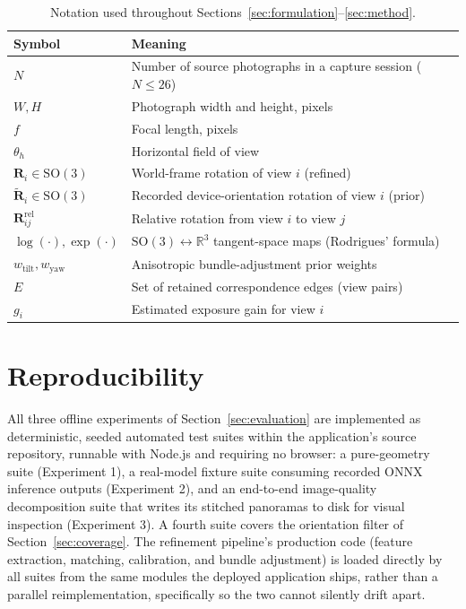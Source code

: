 \documentclass[11pt]{article}
\newcommand{\SO}{\mathrm{SO}(3)}
\newcommand{\R}{\mathbb{R}}
\newcommand{\mat}[1]{\mathbf{#1}}
\begin{document}
\begin{table}[h]
\centering
\small
\begin{tabular}{@{}ll@{}}
\toprule
\textbf{Symbol} & \textbf{Meaning} \\
\midrule
$N$ & Number of source photographs in a capture session ($N \le 26$) \\
$W, H$ & Photograph width and height, pixels \\
$f$ & Focal length, pixels \\
$\theta_h$ & Horizontal field of view \\
$\mat{R}_i \in \SO$ & World-frame rotation of view $i$ (refined) \\
$\tilde{\mat{R}}_i \in \SO$ & Recorded device-orientation rotation of view $i$ (prior) \\
$\mat{R}^{\mathrm{rel}}_{ij}$ & Relative rotation from view $i$ to view $j$ \\
$\log(\cdot), \exp(\cdot)$ & $\SO \leftrightarrow \R^3$ tangent-space maps (Rodrigues' formula) \\
$w_{\mathrm{tilt}}, w_{\mathrm{yaw}}$ & Anisotropic bundle-adjustment prior weights \\
$E$ & Set of retained correspondence edges (view pairs) \\
$g_i$ & Estimated exposure gain for view $i$ \\
\bottomrule
\end{tabular}
\caption{Notation used throughout Sections~\ref{sec:formulation}--\ref{sec:method}.}
\end{table}

\section{Reproducibility}

All three offline experiments of Section~\ref{sec:evaluation} are implemented as deterministic, seeded automated test suites within the application's source repository, runnable with Node.js and requiring no browser: a pure-geometry suite (Experiment 1), a real-model fixture suite consuming recorded ONNX inference outputs (Experiment 2), and an end-to-end image-quality decomposition suite that writes its stitched panoramas to disk for visual inspection (Experiment 3). A fourth suite covers the orientation filter of Section~\ref{sec:coverage}. The refinement pipeline's production code (feature extraction, matching, calibration, and bundle adjustment) is loaded directly by all suites from the same modules the deployed application ships, rather than a parallel reimplementation, specifically so the two cannot silently drift apart.
\end{document}
